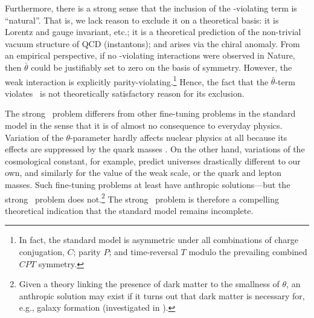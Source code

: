 Furthermore, there is a strong sense that the inclusion of the \CP-violating term is ``natural''.
That is, we lack reason to exclude it on a theoretical basis: it is Lorentz and gauge invariant, etc.; it is a theoretical prediction of the non-trivial vacuum structure of QCD (instantons); and arises via the chiral anomaly.
From an empirical perspective, if no \CP-violating interactions were observed in Nature, then $\bar θ$ could be justifiably set to zero on the basis of symmetry.
However, the weak interaction is explicitly parity-violating.\footnote{
	In fact, the standard model is asymmetric under all combinations of charge conjugation, $C$; parity $P$; and time-reversal $T$ modulo the prevailing combined $CPT$ symmetry.
}
Hence, the fact that the $\bar θ$-term violates \CP\ is not theoretically satisfactory reason for its exclusion.





The strong \CP\ problem differers from other fine-tuning problems in the standard model in the sense that it is of almost no consequence to everyday physics.
Variation of the $θ$-parameter hardly affects nuclear physics at all because its effects are suppressed by the quark masses \cite{Dine_2018}.
On the other hand, variations of the cosmological constant, for example, predict universes drastically different to our own, and similarly for the value of the weak scale, or the quark and lepton masses.
Such fine-tuning problems at least have anthropic solutions---but the strong \CP\ problem does not.\footnote{
	Given a theory linking the presence of dark matter to the smallness of $θ$, an anthropic solution may exist if it turns out that dark matter is necessary for, e.g., galaxy formation (investigated in \cite{Dine_2018}).
}
The strong \CP\ problem is therefore a compelling theoretical indication that the standard model remains incomplete.
